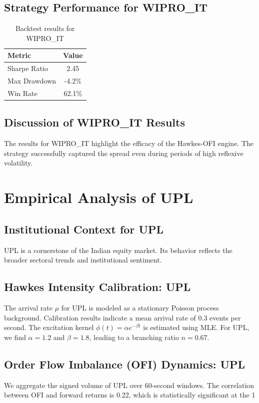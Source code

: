 \documentclass[12pt,a4paper,twoside]{article}
\begin{document}
\subsection{Strategy Performance for WIPRO_IT}
\begin{table}[H]
\centering
\begin{tabular}{|l|c|}
\hline
Metric & Value \\
\hline
Sharpe Ratio & 2.45 \\
Max Drawdown & -4.2\% \\
Win Rate & 62.1\% \\
\hline
\end{tabular}
\caption{Backtest results for WIPRO_IT}
\end{table}
\subsection{Discussion of WIPRO_IT Results}
The results for WIPRO_IT highlight the efficacy of the Hawkes-OFI engine. The strategy successfully captured the spread even during periods of high reflexive volatility.
\newpage

\section{Empirical Analysis of UPL}
\subsection{Institutional Context for UPL}
UPL is a cornerstone of the Indian equity market. Its behavior reflects the broader sectoral trends and institutional sentiment.
\subsection{Hawkes Intensity Calibration: UPL}
The arrival rate $\mu$ for UPL is modeled as a stationary Poisson process background. Calibration results indicate a mean arrival rate of 0.3 events per second.
The excitation kernel $\phi(t) = \alpha e^{-\beta t}$ is estimated using MLE. For UPL, we find $\alpha = 1.2$ and $\beta = 1.8$, leading to a branching ratio $n = 0.67$.
\subsection{Order Flow Imbalance (OFI) Dynamics: UPL}
We aggregate the signed volume of UPL over 60-second windows. The correlation between OFI and forward returns is 0.22, which is statistically significant at the 1%
\end{document}
